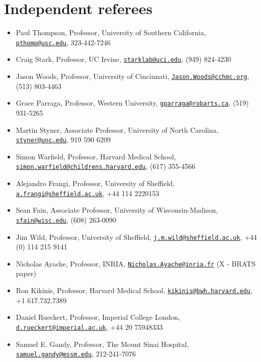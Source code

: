 \documentclass[12pt,]{article}
\title{}
\author{}
\date{}
\providecommand{\tightlist}{%
  \setlength{\itemsep}{0pt}\setlength{\parskip}{0pt}}
\begin{document}
\maketitle


\section{Independent referees}\label{independent-referees}

\begin{itemize}
\tightlist
\item
  Paul Thompson, Professor, University of Southern California,
  \href{mailto:pthomp@usc.edu}{\nolinkurl{pthomp@usc.edu}}, 323-442-7246
\item
  Craig Stark, Professor, UC Irvine,
  \href{mailto:starklab@uci.edu}{\nolinkurl{starklab@uci.edu}}, (949)
  824-4230
\item
  Jason Woods, Professor, University of Cincinnati,
  \href{mailto:Jason.Woods@cchmc.org}{\nolinkurl{Jason.Woods@cchmc.org}},
  (513) 803-4463
\item
  Grace Parraga, Professor, Western University,
  \href{mailto:gparraga@robarts.ca}{\nolinkurl{gparraga@robarts.ca}},
  (519) 931-5265
\item
  Martin Styner, Associate Professor, University of North Carolina,
  \href{mailto:styner@unc.edu}{\nolinkurl{styner@unc.edu}}, 919 590 6209
\item
  Simon Warfield, Professor, Harvard Medical School,
  \href{mailto:simon.warfield@childrens.harvard.edu}{\nolinkurl{simon.warfield@childrens.harvard.edu}},
  (617) 355-4566
\item
  Alejandro Frangi, Professor, University of Sheffield,
  \href{mailto:a.frangi@sheffield.ac.uk}{\nolinkurl{a.frangi@sheffield.ac.uk}},
  +44 114 2220153
\item
  Sean Fain, Associate Professor, University of Wisconsin-Madison,
  \href{mailto:sfain@wisc.edu}{\nolinkurl{sfain@wisc.edu}}, (608)
  263-0090
\item
  Jim Wild, Professor, University of Sheffield,
  \href{mailto:j.m.wild@sheffield.ac.uk}{\nolinkurl{j.m.wild@sheffield.ac.uk}},
  +44 (0) 114 215 9141
\item
  Nicholas Ayache, Professor, INRIA,
  \href{mailto:Nicholas.Ayache@inria.fr}{\nolinkurl{Nicholas.Ayache@inria.fr}}
  (X - BRATS paper)
\item
  Ron Kikinis, Professor, Harvard Medical School,
  \href{mailto:kikinis@bwh.harvard.edu}{\nolinkurl{kikinis@bwh.harvard.edu}},
  +1 617.732.7389
\item
  Daniel Rueckert, Professor, Imperial College London,
  \href{mailto:d.rueckert@imperial.ac.uk}{\nolinkurl{d.rueckert@imperial.ac.uk}},
  +44 20 75948333
\item
  Samuel E. Gandy, Professor, The Mount Sinai Hospital,
  \href{mailto:samuel.gandy@mssm.edu}{\nolinkurl{samuel.gandy@mssm.edu}},
  212-241-7076
\end{itemize}
\end{document}
